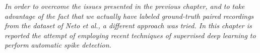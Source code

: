 
\label{cap:chapter3}

\textit{In order to overcome the issues presented in the previous chapter, and to take advantage of the fact that we actually have labeled ground-truth paired recordings from the dataset of Neto et al., a different approach was tried. In this chapter is reported the attempt of employing recent techniques of supervised deep learning to perform automatic spike detection.}

%
%


\cleardoublepage
